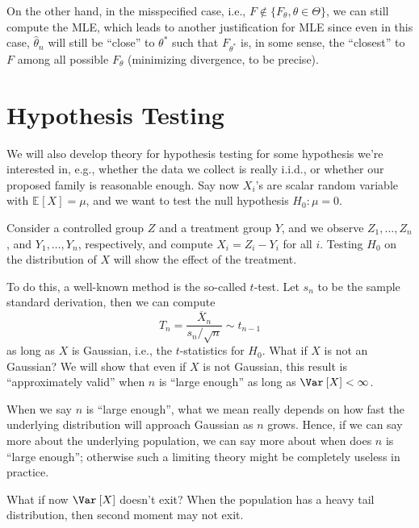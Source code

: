 On the other hand, in the misspecified case, i.e., \(F \notin \{ F_{\theta } , \theta \in \Theta \} \), we can still compute the MLE, which leads to another justification for MLE since even in this case, \(\hat{\theta} _n\) will still be ``close'' to \(\theta ^{\ast} \) such that \(F_{\theta ^{\ast} }\) is, in some sense, the ``closest'' to \(F\) among all possible \(F_\theta \) (minimizing divergence, to be precise).

\section{Hypothesis Testing}
We will also develop theory for hypothesis testing for some hypothesis we're interested in, e.g., whether the data we collect is really i.i.d., or whether our proposed family is reasonable enough. Say now \(X_i\)'s are scalar random variable with \(\mathbb{E}_{}\left[X \right] = \mu \), and we want to test the null hypothesis \(H_0 \colon \mu = 0\).

\begin{eg}
	Consider a controlled group \(Z\) and a treatment group \(Y\), and we observe \(Z_1, \dots , Z_n\), and \(Y_1, \dots , Y_n\), respectively, and compute \(X_i = Z_i - Y_i\) for all \(i\). Testing \(H_0\) on the distribution of \(X\) will show the effect of the treatment.
\end{eg}

To do this, a well-known method is the so-called \(t\)-test. Let \(s_n\) to be the sample standard derivation, then we can compute
\[
	T_n = \frac{\overline{X} _n}{s_n / \sqrt{n} } \sim t_{n-1}
\]
as long as \(X\) is Gaussian, i.e., the \(t\)-statistics for \(H_0\). What if \(X\) is not an Gaussian? We will show that even if \(X\) is not Gaussian, this result is ``approximately valid'' when \(n\) is ``large enough'' as long as \(\Var_{}\left[X \right] < \infty \).

\begin{remark}
	When we say \(n\) is ``large enough'', what we mean really depends on how fast the underlying distribution will approach Gaussian as \(n\) grows. Hence, if we can say more about the underlying population, we can say more about when does \(n\) is ``large enough''; otherwise such a limiting theory might be completely useless in practice.
\end{remark}

What if now \(\Var_{}\left[X \right] \) doesn't exit? When the population has a heavy tail distribution, then second moment may not exit.

